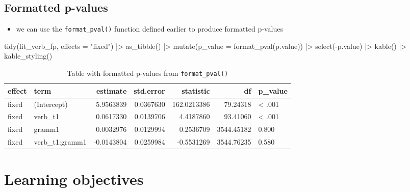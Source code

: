 \documentclass[
  letterpaper,
  DIV=11,
  numbers=noendperiod]{scrartcl}
\newenvironment{Shaded}{\begin{snugshade}}{\end{snugshade}}
\newcommand{\AttributeTok}[1]{\textcolor[rgb]{0.40,0.45,0.13}{#1}}
\newcommand{\FunctionTok}[1]{\textcolor[rgb]{0.28,0.35,0.67}{#1}}
\newcommand{\NormalTok}[1]{\textcolor[rgb]{0.00,0.23,0.31}{#1}}
\newcommand{\SpecialCharTok}[1]{\textcolor[rgb]{0.37,0.37,0.37}{#1}}
\newcommand{\StringTok}[1]{\textcolor[rgb]{0.13,0.47,0.30}{#1}}
\providecommand{\tightlist}{%
  \setlength{\itemsep}{0pt}\setlength{\parskip}{0pt}}\usepackage{longtable,booktabs,array}
\begin{document}
\hypertarget{formatted-p-values}{%
\subsection{Formatted p-values}\label{formatted-p-values}}

\begin{itemize}
\tightlist
\item
  we can use the \texttt{format\_pval()} function defined earlier to
  produce formatted p-values
\end{itemize}

\begin{Shaded}
\begin{Highlighting}[]
  \FunctionTok{tidy}\NormalTok{(fit\_verb\_fp,}
     \AttributeTok{effects =} \StringTok{"fixed"}\NormalTok{) }\SpecialCharTok{|\textgreater{}} 
  \FunctionTok{as\_tibble}\NormalTok{() }\SpecialCharTok{|\textgreater{}} 
  \FunctionTok{mutate}\NormalTok{(}\AttributeTok{p\_value =} \FunctionTok{format\_pval}\NormalTok{(p.value)) }\SpecialCharTok{|\textgreater{}} 
  \FunctionTok{select}\NormalTok{(}\SpecialCharTok{{-}}\NormalTok{p.value) }\SpecialCharTok{|\textgreater{}} 
  \FunctionTok{kable}\NormalTok{() }\SpecialCharTok{|\textgreater{}} 
  \FunctionTok{kable\_styling}\NormalTok{()}
\end{Highlighting}
\end{Shaded}

\hypertarget{tbl-format_pval}{}
\begin{longtable}[t]{llrrrrl}
\caption{\label{tbl-format_pval}Table with formatted p-values from \texttt{format\_pval()} }\tabularnewline

\toprule
effect & term & estimate & std.error & statistic & df & p\_value\\
\midrule
fixed & (Intercept) & 5.9563839 & 0.0367630 & 162.0213386 & 79.24318 & < .001\\
fixed & verb\_t1 & 0.0617330 & 0.0139706 & 4.4187860 & 93.41060 & < .001\\
fixed & gramm1 & 0.0032976 & 0.0129994 & 0.2536709 & 3544.45182 & 0.800\\
fixed & verb\_t1:gramm1 & -0.0143804 & 0.0259984 & -0.5531269 & 3544.76235 & 0.580\\
\bottomrule
\end{longtable}

\hypertarget{learning-objectives-1}{%
\section*{Learning objectives 🏁}\label{learning-objectives-1}}
\end{document}
